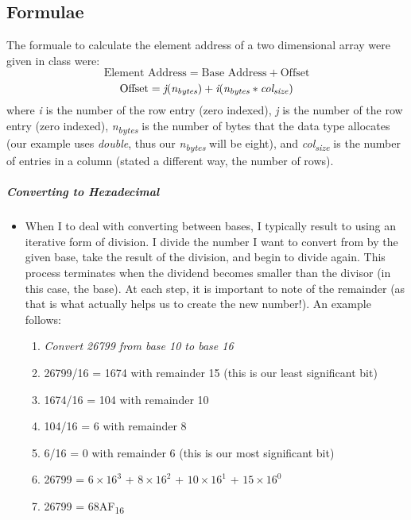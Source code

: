 \documentclass[12pt]{article}
\begin{document}
\subsection{Formulae}
The formuale to calculate the element address of a two dimensional array were given in class were:
\begin{equation}
\text{Element Address} = \text{Base Address} + \text{Offset}
\end{equation}
\begin{equation}
\text{Offset} = \textit{j}(\textit{n\textsubscript{bytes}}) + \textit{i}(\textit{n\textsubscript{bytes}}*\textit{col\textsubscript{size}})
\end{equation}
where \textit{i} is the number of the row entry (zero indexed), \textit{j} is the number of the row entry (zero indexed), \textit{n\textsubscript{bytes}} is the number of bytes that the data type allocates (our example uses \textit{double}, thus our \textit{n\textsubscript{bytes}} will be eight), and \textit{col\textsubscript{size}} is the number of entries in a column (stated a different way, the number of rows).
\subparagraph{Converting to Hexadecimal}
\begin{itemize}[leftmargin=1.5em]
\item[] When I to deal with converting between bases, I typically result to using an iterative form of division. I divide the number I want to convert from by the given base, take the result of the division, and begin to divide again. This process terminates when the dividend becomes smaller than the divisor (in this case, the base). At each step, it is important to note of the remainder (as that is what actually helps us to create the new number!). An example follows:
\begin{enumerate}
\item[] \textit{Convert 26799 from base 10 to base 16}
\item 26799/16 = 1674 with remainder 15 (this is our least significant bit)
\item 1674/16 = 104 with remainder 10
\item 104/16 = 6 with remainder 8
\item 6/16 = 0 with remainder 6 (this is our most significant bit)
\item 26799 = $6\times16^3$ + $8\times16^2$ + $10\times16^1$ + $15\times16^0$
\item 26799 = 68AF\textsubscript{16}
\end{enumerate}
\end{itemize}
\end{document}
